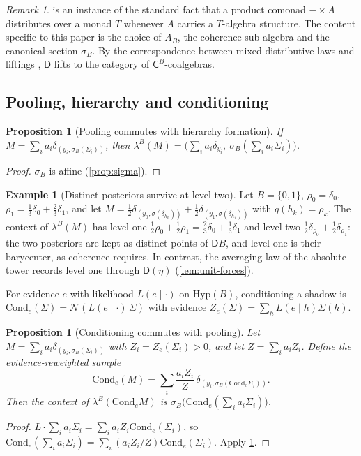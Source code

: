 \documentclass[11pt]{article}
\newtheorem{proposition}[theorem]{Proposition}
\theoremstyle{definition}
\newtheorem{example}[theorem]{Example}
\theoremstyle{remark}
\newtheorem{remark}[theorem]{Remark}
\newcommand{\D}{\mathsf{D}}
\newcommand{\Hyp}{\mathrm{Hyp}}
\newcommand{\Cond}{\mathrm{Cond}}
\newcommand{\C}{\mathsf{C}}
\newcommand{\N}{\mathcal{N}}
\begin{document}
\begin{remark}
 is an instance of the standard fact that a product comonad $-\times A$
distributes over a monad $T$ whenever $A$ carries a $T$-algebra structure. The content specific to
this paper is the choice of $A_B$, the coherence sub-algebra and the canonical section $\sigma_B$. By
the correspondence between mixed distributive laws and liftings \cite{PowerWatanabe2002}, $\D$ lifts
to the category of $\C^B$-coalgebras.
\end{remark}

\subsection{Pooling, hierarchy and conditioning}

\begin{proposition}[Pooling commutes with hierarchy formation]\label{prop:pooling}
If $M=\sum_ia_i\delta_{(y_i,\sigma_B(\Sigma_i))}$, then
$\lambda^B(M)=\big(\sum_ia_i\delta_{y_i},\ \sigma_B(\sum_ia_i\Sigma_i)\big)$.
\end{proposition}
\begin{proof}
$\sigma_B$ is affine (\cref{prop:sigma}).
\end{proof}

\begin{example}[Distinct posteriors survive at level two]\label{ex:level2}
Let $B=\{0,1\}$, $\rho_0=\delta_0$, $\rho_1=\tfrac13\delta_0+\tfrac23\delta_1$, and let
$M=\tfrac12\delta_{(y_0,\sigma(\delta_{h_0}))}+\tfrac12\delta_{(y_1,\sigma(\delta_{h_1}))}$ with
$q(h_k)=\rho_k$. The context of $\lambda^B(M)$ has level one
$\tfrac12\rho_0+\tfrac12\rho_1=\tfrac23\delta_0+\tfrac13\delta_1$ and level two
$\tfrac12\delta_{\rho_0}+\tfrac12\delta_{\rho_1}$: the two posteriors are kept as distinct points of
$\D B$, and level one is their barycenter, as coherence requires. In contrast, the averaging law of
the absolute tower records level one through $\D(\eta)$ (\cref{lem:unit-forces}).
\end{example}

For evidence $e$ with likelihood $L(e\mid\cdot)$ on $\Hyp(B)$, conditioning a shadow is
$\Cond_e(\Sigma)=\N(L(e\mid\cdot)\,\Sigma)$ with evidence $Z_e(\Sigma)=\sum_hL(e\mid h)\Sigma(h)$.

\begin{proposition}[Conditioning commutes with pooling]\label{prop:cond-pool}
Let $M=\sum_ia_i\delta_{(y_i,\sigma_B(\Sigma_i))}$ with $Z_i=Z_e(\Sigma_i)>0$, and let
$Z=\sum_ia_iZ_i$. Define the evidence-reweighted sample
\[
\Cond_e(M)=\sum_i\frac{a_iZ_i}{Z}\,\delta_{(y_i,\sigma_B(\Cond_e\Sigma_i))}.
\]
Then the context of $\lambda^B(\Cond_eM)$ is $\sigma_B\big(\Cond_e(\sum_ia_i\Sigma_i)\big)$.
\end{proposition}
\begin{proof}
$L\cdot\sum_ia_i\Sigma_i=\sum_ia_iZ_i\Cond_e(\Sigma_i)$, so
$\Cond_e(\sum_ia_i\Sigma_i)=\sum_i(a_iZ_i/Z)\Cond_e(\Sigma_i)$. Apply \cref{prop:pooling}.
\end{proof}
\end{document}
